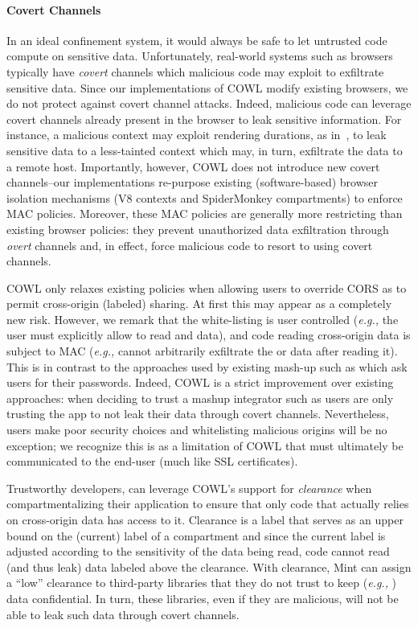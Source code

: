 \paragraph{Covert Channels}
In an ideal confinement system, it would always be safe to let untrusted
code compute on sensitive data.
%
Unfortunately, real-world systems such as browsers typically have
\emph{covert} channels which malicious code may exploit to exfiltrate
sensitive data.
%
Since our implementations of COWL modify existing browsers, we do not
protect against covert channel attacks.
%
Indeed, malicious code can leverage covert channels already present in
the browser to leak sensitive information.
%
For instance, a malicious context may exploit rendering durations, as
in~\cite{kotcher2013cross}, to leak sensitive data to a less-tainted
context which may, in turn, exfiltrate the data to a remote host.
%
Importantly, however, COWL does not introduce new covert channels--our
implementations re-purpose existing (software-based) browser isolation
mechanisms (V8 contexts and SpiderMonkey compartments) to enforce MAC
policies.
%
Moreover, these MAC policies are generally more restricting than
existing browser policies: they prevent unauthorized data exfiltration
through \emph{overt} channels and, in effect, force malicious code to
resort to using covert channels.


COWL only relaxes existing policies when allowing users to override
CORS as to permit cross-origin (labeled) sharing.
%
At first this may appear as a completely new risk.
%
However, we remark that the white-listing is user controlled (\emph{e.g.,}
the user must explicitly allow  to read
 and  data), and code reading
cross-origin data is subject to MAC (\emph{e.g.,}  cannot
arbitrarily exfiltrate the  or 
data after reading it).
%
This is in contrast to the approaches used by existing mash-up such as
 which ask users for their passwords.
%
Indeed, COWL is a strict improvement over existing approaches: when
deciding to trust a mashup integrator such as  users
are only trusting the app to not leak their data through covert
channels.
%
Nevertheless, users make poor security choices and whitelisting
malicious origins will be no exception; we recognize this is as a
limitation of COWL that must ultimately be communicated to the end-user
(much like SSL certificates).

Trustworthy developers, can leverage COWL's support for
\emph{clearance} when compartmentalizing their application to ensure
that only code that actually relies on cross-origin data has access to
it.
%
Clearance is a label that serves as an upper bound on the (current)
label of a compartment and since the current label is adjusted
according to the sensitivity of the data being read, code cannot read
(and thus leak) data labeled above the clearance.
%
With clearance, Mint can assign a ``low'' clearance to
third-party libraries that they do not trust to keep (\emph{e.g.,}
) data confidential.
%
In turn, these libraries, even if they are malicious, will not be able
to leak such data through covert channels.

